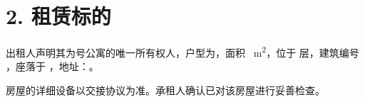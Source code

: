 \section*{2. 租赁标的}
出租人声明其为\Propunitnumber 号公寓的唯一所有权人，户型为\Propdisposition，面积 \Propaream~m\textsuperscript{2}，位于 \Propfloor 层，建筑编号 \Propbuildingnumber，座落于 \Propcadastralterritory，地址：\Propaddress。

房屋的详细设备以交接协议为准。承租人确认已对该房屋进行妥善检查。
